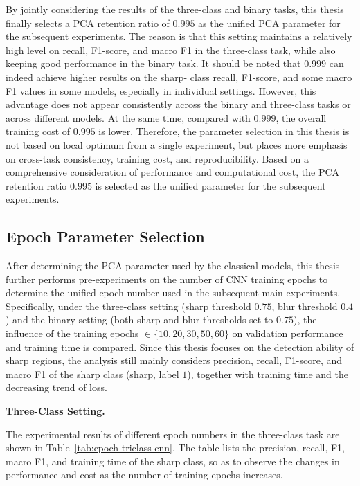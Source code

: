 \par By jointly considering the results of the three-class and binary tasks,
this thesis finally selects a PCA retention ratio of $0.995$ as the unified
PCA parameter for the subsequent experiments. The reason is that this setting
maintains a relatively high level on recall, F1-score, and macro F1 in the
three-class task, while also keeping good performance in the binary task. It
should be noted that $0.999$ can indeed achieve higher results on the sharp-
class recall, F1-score, and some macro F1 values in some models, especially in
individual settings. However, this advantage does not appear consistently
across the binary and three-class tasks or across different models. At the
same time, compared with $0.999$, the overall training cost of $0.995$ is
lower. Therefore, the parameter selection in this thesis is not based on local
optimum from a single experiment, but places more emphasis on cross-task
consistency, training cost, and reproducibility. Based on a comprehensive
consideration of performance and computational cost, the PCA retention ratio
$0.995$ is selected as the unified parameter for the subsequent experiments.

\subsection{Epoch Parameter Selection}
\par After determining the PCA parameter used by the classical models, this
thesis further performs pre-experiments on the number of CNN training epochs to
determine the unified epoch number used in the subsequent main experiments.
Specifically, under the three-class setting (sharp threshold $0.75$, blur
threshold $0.4$) and the binary setting (both sharp and blur thresholds set to
$0.75$), the influence of the training epochs
\(\in\{10,20,30,50,60\}\) on validation performance and training time is
compared. Since this thesis focuses on the detection ability of sharp regions,
the analysis still mainly considers precision, recall, F1-score, and macro F1
of the sharp class (sharp, label $1$), together with training time and the
decreasing trend of loss.

\par\medskip \noindent\textbf{Three-Class Setting.} \par The experimental
results of different epoch numbers in the three-class task are shown in
Table~\ref{tab:epoch-triclass-cnn}. The table lists the precision, recall, F1,
macro F1, and training time of the sharp class, so as to observe the changes
in performance and cost as the number of training epochs increases.

